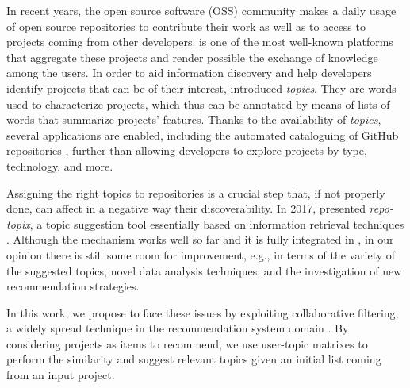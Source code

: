 In recent years, the open source software (OSS) community 
makes a daily usage of open source repositories to 
contribute their work as well as to access to projects 
coming from other developers. \GH is one of the most 
well-known platforms that aggregate these projects and 
render possible the exchange of knowledge among the users.
%
In order to aid information discovery and help 
developers identify projects that can be of their interest, \GH introduced \emph{topics}. They are 
words used to characterize projects, which thus can be 
annotated by means of lists of words that summarize projects' features. Thanks 
to the availability of \emph{topics}, several applications are enabled, 
including the automated cataloguing of GitHub repositories \cite{davidlo1}, 
further than allowing developers to explore projects by type, technology, and 
more.

Assigning the right topics to \GH repositories is a crucial step that, if not 
properly done, can affect in a negative way their discoverability. In 
2017, \GH presented \textit{repo-topix}, a topic suggestion tool essentially 
based on information retrieval techniques \cite{noauthor_topic_nodate}. 
Although the mechanism works well so far and it is fully integrated in \GH, in our 
opinion there is still some room for improvement, e.g., in terms of the variety 
of the suggested topics, novel data analysis techniques, and the investigation of new recommendation strategies.

In this work, we propose to face these issues by exploiting collaborative filtering, a widely spread technique in the recommendation system domain \cite{}. By considering \GH projects as items to recommend,  we use user-topic matrixes to perform the similarity and suggest relevant topics given an initial list coming from an input project. 